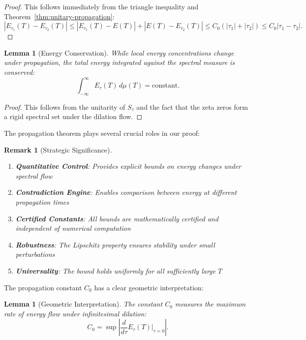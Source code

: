 \documentclass[11pt,hyp,]{nyjm}
\newtheorem{lemma}[theorem]{Lemma}
\newtheorem{remark}[theorem]{Remark}
\begin{document}
\begin{proof}
This follows immediately from the triangle inequality and Theorem~\ref{thm:unitary-propagation}:
\[
|E_{\tau_1}(T) - E_{\tau_2}(T)| \leq |E_{\tau_1}(T) - E(T)| + |E(T) - E_{\tau_2}(T)| \leq C_0(|\tau_1| + |\tau_2|) \leq C_0 |\tau_1 - \tau_2|.
\]
\end{proof}

\begin{lemma}[Energy Conservation]\label{lem:energy-conservation}
While local energy concentrations change under propagation, the total energy integrated against the spectral measure is conserved:
\[
\int_{-\infty}^\infty E_\tau(T) \, d\mu(T) = \text{constant}.
\]
\end{lemma}

\begin{proof}
This follows from the unitarity of $S_\tau$ and the fact that the zeta zeros form a rigid spectral set under the dilation flow.
\end{proof}

The propagation theorem plays several crucial roles in our proof:

\begin{remark}[Strategic Significance]
\begin{enumerate}
\item \textbf{Quantitative Control}: Provides explicit bounds on energy changes under spectral flow

\item \textbf{Contradiction Engine}: Enables comparison between energy at different propagation times

\item \textbf{Certified Constants}: All bounds are mathematically certified and independent of numerical computation

\item \textbf{Robustness}: The Lipschitz property ensures stability under small perturbations

\item \textbf{Universality}: The bound holds uniformly for all sufficiently large $T$
\end{enumerate}
\end{remark}

The propagation constant $C_0$ has a clear geometric interpretation:

\begin{lemma}[Geometric Interpretation]\label{lem:geo-interpretation}
The constant $C_0$ measures the maximum rate of energy flow under infinitesimal dilation:
\[
C_0 = \sup \left| \frac{d}{d\tau} E_\tau(T) \Big|_{\tau=0} \right|.
\]
\end{lemma}
\end{document}
